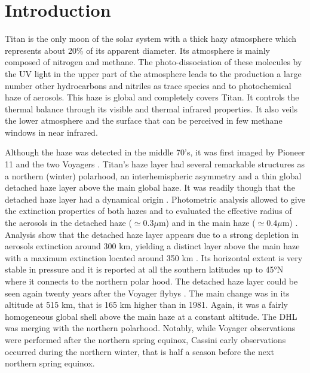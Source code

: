 \section{Introduction}

Titan is the only moon of the solar system with a thick hazy atmosphere which represents about 20\% of its apparent
diameter. Its atmosphere is mainly composed of nitrogen and methane. The photo-dissociation of these molecules by the
UV light in the upper part of the atmosphere leads to the production a large number other hydrocarbons and nitriles as
trace species and to photochemical haze of aerosols. This haze is global and completely covers Titan. It controls
the thermal balance through its visible and thermal infrared properties. It also veils the lower atmosphere and the
surface that can be perceived in few methane windows in near infrared.

Although the haze was detected in the middle 70's, it was first imaged by Pioneer 11 and the two Voyagers
\citep{Smith1981, Smith1982, Sromovsky1981}. Titan's haze layer had several remarkable structures as a northern (winter)
polarhood, an interhemispheric asymmetry and a thin global detached haze layer above the main global haze. It was
readily though that the detached haze layer had a dynamical origin \citep{Smith1981}. Photometric analysis allowed
to give the extinction properties of both hazes and to evaluated the effective radius of the aerosols in the detached
haze ($\simeq 0.3 \mu$m) and in the main haze ($\simeq 0.4 \mu$m) \citep{Rages1983, Rages1983a}. Analysis show
that the detached haze layer appears due to a strong depletion in aerosols extinction around 300 km, yielding a distinct
layer above the main haze with a maximum extinction located around 350 km \citep{Rages1983}. Its horizontal extent is
very stable in pressure and it is reported at all the southern latitudes up to \ang{45}N where it connects to the northern
polar hood. The detached haze layer could be seen again twenty years after the Voyager flybys \citep{Porco2005}. The
main change was in its altitude at 515 km, that is 165 km higher than in 1981. Again, it was a fairly homogeneous global
shell above the main haze at a constant altitude. The DHL was merging with the northern polarhood. Notably, while Voyager
observations were performed after the northern spring equinox, Cassini early observations occurred during the northern
winter, that is half a season before the next northern spring equinox.

